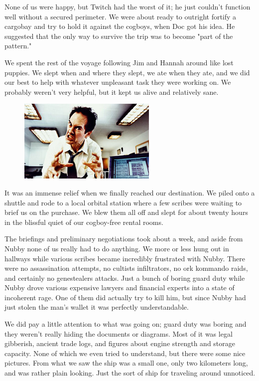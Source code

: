 None of us were happy, but Twitch had the worst of it; 
he just couldn’t function well without a secured perimeter. 
We were about ready to outright fortify a cargobay and try to hold it against the cogboys, when Doc got his idea. 
He suggested that the only way to survive the trip was to become "part of the pattern."

We spent the rest of the voyage following Jim and Hannah around like lost puppies. 
We slept when and where they slept, we ate when they ate, and we did our best to help with whatever unpleasant task they were working on. 
We probably weren’t very helpful, but it kept us alive and relatively sane.

\begin{figure}
	\begin{center}
		\includegraphics[width=\figwidth]{pics/7/6.png}
	\end{center}
\end{figure}
It was an immense relief when we finally reached our destination. 
We piled onto a shuttle and rode to a local orbital station where a few scribes were waiting to brief us on the purchase. 
We blew them all off and slept for about twenty hours in the blissful quiet of our cogboy-free rental rooms.

The briefings and preliminary negotiations took about a week, and aside from Nubby none of us really had to do anything. 
We more or less hung out in hallways while various scribes became incredibly frustrated with Nubby. 
There were no assassination attempts, no cultists infiltrators, no ork kommando raids, and certainly no genestealers attacks. 
Just a bunch of boring guard duty while Nubby drove various expensive lawyers and financial experts into a state of incoherent rage. 
One of them did actually try to kill him, but since Nubby had just stolen the man’s wallet it was perfectly understandable.

We did pay a little attention to what was going on; 
guard duty was boring and they weren’t really hiding the documents or diagrams. 
Most of it was legal gibberish, ancient trade logs, and figures about engine strength and storage capacity. 
None of which we even tried to understand, but there were some nice pictures. 
From what we saw the ship was a small one, only two kilometers long, and was rather plain looking. 
Just the sort of ship for traveling around unnoticed.

